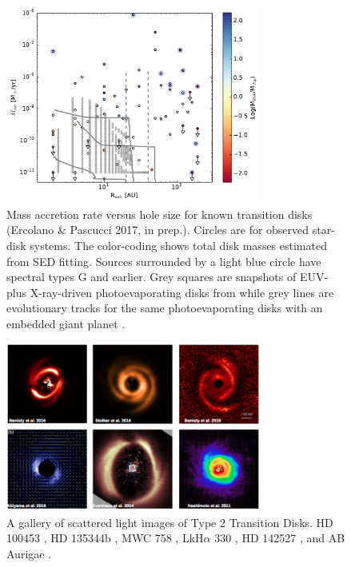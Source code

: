 \documentclass[10pt,fleqn,twoside,a4paper]{article}
\begin{document}
\begin{figure}
\centerline{\includegraphics[width=0.75\textwidth]{figures/Macc_Rhole_Mdisk.pdf}}
\caption{\label{fig-macc-rhole-mdisc}
  Mass accretion rate versus hole size for known transition
  disks (Ercolano \& Pascucci 2017, in prep.). Circles are for
  observed star-disk systems. The color-coding shows total disk masses
  estimated from SED fitting. Sources surrounded by a
  light blue circle have spectral types G and earlier. Grey squares
  are snapshots of EUV- plus X-ray-driven photoevaporating disks from
  \citet{2011MNRAS.412...13O} while grey lines are evolutionary tracks for the
  same photoevaporating disks with an embedded giant planet 
  \citep{2013MNRAS.430.1392R}.} 
\end{figure}


\begin{figure}
\centerline{\includegraphics[width=0.75\textwidth]{figures/Type2TD_Scat.png}}
\caption{\label{fig-type2-scat}
  A gallery of scattered light images of Type 2 Transition Disks. 
 HD 100453 
\citep{2017A&A...597A..42B}, HD 135344b \citep{2016A&A...595A.113S},
MWC 758 \citep{2015A&A...578L...6B}, LkH$\alpha$ 330 \citep{2016AJ....152..222A}, 
HD 142527 \citep{2014ApJ...781...87A}, and AB Aurigae \citep{2011ApJ...729L..17H}.} 
\end{figure}
\end{document}
